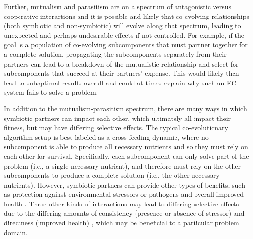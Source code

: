 Further, mutualism and parasitism are on a spectrum of antagonistic versus cooperative interactions and it is possible and likely that co-evolving relationships (both symbiotic and non-symbiotic) will evolve along that spectrum, leading to unexpected and perhaps undesirable effects if not controlled.
For example, if the goal is a population of co-evolving subcomponents that must partner together for a complete solution, propagating the subcomponents separately from their partners can lead to a breakdown of the mutualistic relationship and select for subcomponents that succeed at their partners' expense.
This would likely then lead to suboptimal results overall and could at times explain why such an EC system fails to solve a problem.

In addition to the mutualism-parasitism spectrum, there are many ways in which symbiotic partners can impact each other, which ultimately all impact their fitness, but may have differing selective effects.
The typical co-evolutionary algorithm setup is best labeled as a cross-feeding dynamic, where no subcomponent is able to produce all necessary nutrients and so they must rely on each other for survival.
Specifically, each subcomponent can only solve part of the problem (i.e., a single necessary nutrient), and therefore must rely on the other subcomponents to produce a complete solution (i.e., the other necessary nutrients).
However, symbiotic partners can provide other types of benefits, such as protection against environmental stressors or pathogens \citep{trivedi2020plant} and overall improved health \citep{stengel2022rethinking}.
These other kinds of interactions may lead to differing selective effects due to the differing amounts of consistency (presence or absence of stressor) and directness (improved health) \citep{buckling2002role, benard2020stress, apprill2020role}, which may be beneficial to a particular problem domain.


